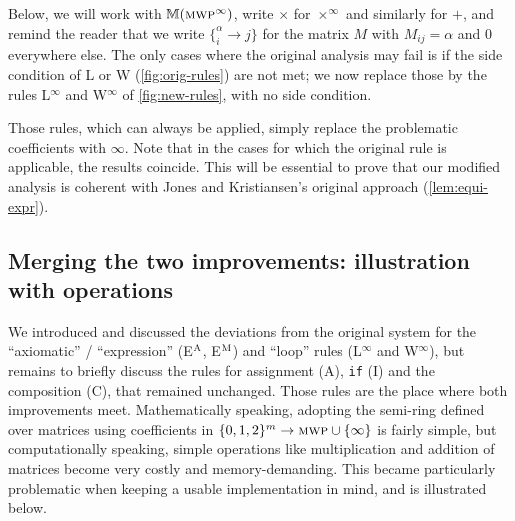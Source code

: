 \documentclass[runningheads]{llncs}
\newcommand{\pr}{\lstinline[mathescape]}
\begin{document}
Below, we will work with \(\mathbb{M}(\textsc{mwp}^\infty)\), write \(\times\) for \(\times^{\infty}\) and similarly for \(+\), and remind the reader that we write \(\{_{i}^{\alpha} \rightarrow j\}\) for the matrix \(M\) with \(M_{ij} = \alpha\) and \(0\) everywhere else.
The only cases where the original analysis may fail is if the side condition of L or W (\autoref{fig:orig-rules}) are not met; we now replace those by the rules L$^\infty$ and W$^\infty$ of \autoref{fig:new-rules}, with no side condition.

Those rules, which can always be applied, simply replace the problematic coefficients with \(\infty\). Note that in the cases for which the original rule is applicable, the results coincide.
This will be essential to prove that our modified analysis is coherent with Jones and Kristiansen's original approach (\autoref{lem:equi-expr}).

\subsection{Merging the two improvements: illustration with operations}

We introduced and discussed the deviations from the original system for the \enquote{axiomatic} / \enquote{expression} (E\(^{\textsc{A}}\), E\(^{\textsc{M}}\)) and \enquote{loop} rules (L$^\infty$ and W$^\infty$), but remains to briefly discuss the rules for assignment (A), \pr|if| (I) and the composition (C), that remained unchanged.
Those rules are the place where both improvements meet.
Mathematically speaking, adopting the semi-ring defined over matrices using coefficients in \(\{0, 1, 2\}^m \to \textsc{mwp} \cup \{\infty\}\) is fairly simple, but computationally speaking, simple operations like multiplication and addition of matrices become very costly and memory-demanding.
This became particularly problematic when keeping a usable implementation in mind, and is illustrated below.
\end{document}
